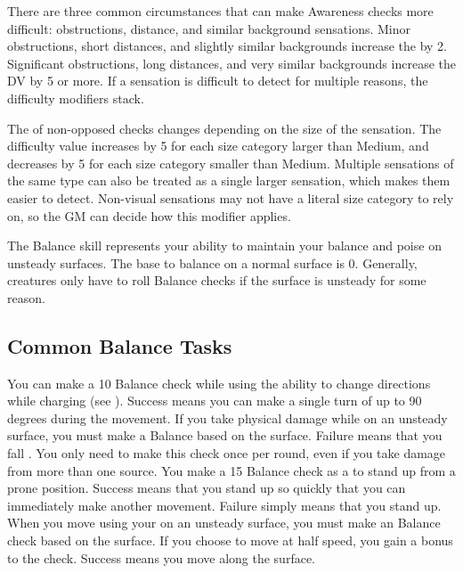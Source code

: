         There are three common circumstances that can make Awareness checks more difficult: obstructions, distance, and similar background sensations.
        Minor obstructions, short distances, and slightly similar backgrounds increase the  by 2.
        Significant obstructions, long distances, and very similar backgrounds increase the DV by 5 or more.
        If a sensation is difficult to detect for multiple reasons, the difficulty modifiers stack.

        The  of non-opposed checks changes depending on the size of the sensation.
        The difficulty value increases by 5 for each size category larger than Medium, and decreases by 5 for each size category smaller than Medium.
        Multiple sensations of the same type can also be treated as a single larger sensation, which makes them easier to detect.
        Non-visual sensations may not have a literal size category to rely on, so the GM can decide how this modifier applies.

\newpage
{}
    The Balance skill represents your ability to maintain your balance and poise on unsteady surfaces.
    The base  to balance on a normal surface is 0.
    Generally, creatures only have to roll Balance checks if the surface is unsteady for some reason.

    \subsection{Common Balance Tasks}
        \label{Agile Charge} You can make a  10 Balance check while using the  ability to change directions while charging (see ).
        Success means you can make a single turn of up to 90 degrees during the movement.
         If you take physical damage while on an unsteady surface, you must make a Balance  based on the surface.
        Failure means that you fall \prone.
        You only need to make this check once per round, even if you take damage from more than one source.
        \label{Rapid Stand} You make a  15 Balance check as a  to stand up from a prone position.
        Success means that you stand up so quickly that you can immediately make another movement.
        Failure simply means that you stand up.
         When you move using your  on an unsteady surface, you must make an Balance check based on the surface.
        If you choose to move at half speed, you gain a  bonus to the check.
        Success means you move along the surface.

